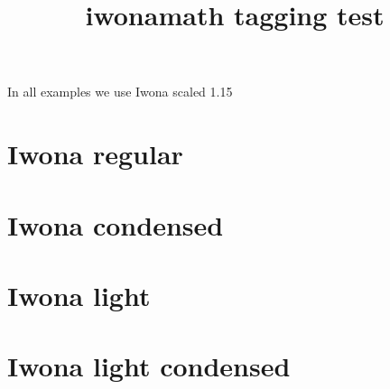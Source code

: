 \documentclass{article}
\title{iwonamath tagging test}
\begin{document}
In all examples we use Iwona scaled 1.15

\section*{Iwona regular}

\sample

\section*{Iwona condensed}

\sample

\section*{Iwona light}

\sample

\section*{Iwona light condensed}

\sample
\end{document}
